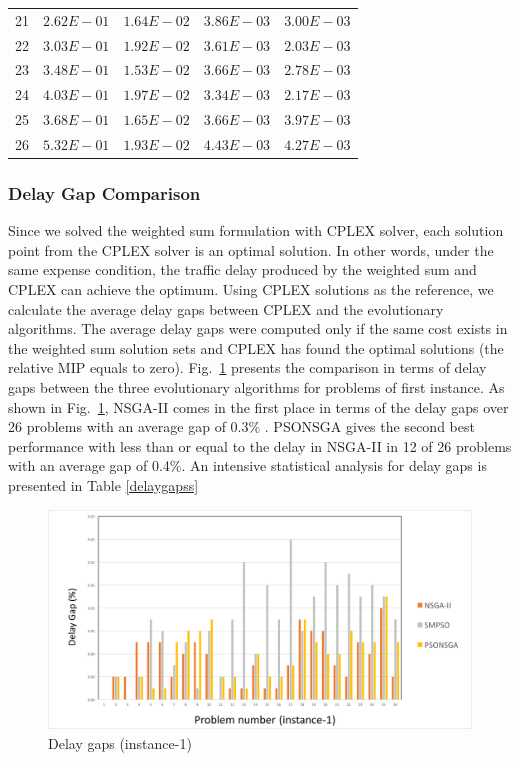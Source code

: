 \documentclass[10pt,journal,compsoc]{IEEEtran}
\newcommand{\Fig}[1]{Fig.~\ref{#1}}
\begin{document}
\begin{table}[ht]
\begin{scriptsize}
{\begin{tabular}{|*{5}{c|}}
21&$2.62E-01$&$1.64E-02$&$3.86E-03$&\cellcolor{gray95}$3.00E-03$\\
22&$3.03E-01$&$1.92E-02$&$3.61E-03$&\cellcolor{gray95}$2.03E-03$\\
23&$3.48E-01$&$1.53E-02$&$3.66E-03$&\cellcolor{gray95}$2.78E-03$\\
24&$4.03E-01$&$1.97E-02$&$3.34E-03$&\cellcolor{gray95}$2.17E-03$\\
25&$3.68E-01$&$1.65E-02$&\cellcolor{gray95}$3.66E-03$&$3.97E-03$\\
26&$5.32E-01$&$1.93E-02$&$4.43E-03$&\cellcolor{gray95}$4.27E-03$\\\hline
\end{tabular}}
\end{scriptsize}
\end{table}



\subsubsection{Delay Gap Comparison}
Since we solved the weighted sum formulation with CPLEX solver, each solution point from the CPLEX solver is an optimal solution. In other words, under the same expense condition, the traffic delay produced by the weighted sum and CPLEX can achieve the optimum. Using CPLEX solutions as the reference, we calculate the average delay gaps between CPLEX and the evolutionary algorithms. The average delay gaps were computed only if the same cost exists in the weighted sum solution sets and CPLEX has found the optimal solutions (the relative MIP equals to zero). 
\iffalse
\Fig{delaygapinstanc1} presents the comparison in terms of delay gaps between the three evolutionary algorithms for problems of first instance. As shown in \Fig{delaygapinstanc1},  NSGA-II comes in the first place in terms of the delay gaps over 26 problems with an average gap of 0.3\% . PSONSGA gives the second best performance with less than or equal to the delay in NSGA-II in 12 of 26 problems with an average gap of 0.4\%. An intensive statistical analysis for delay gaps is presented in Table \ref{delaygapss}

\begin{figure}[ht]
\centerline{\includegraphics[page=1,width=5.5in]{delaygapfiture.png}}
\caption{Delay gaps (instance-1)} 
\label{delaygapinstanc1}
\end{figure}
\end{document}
